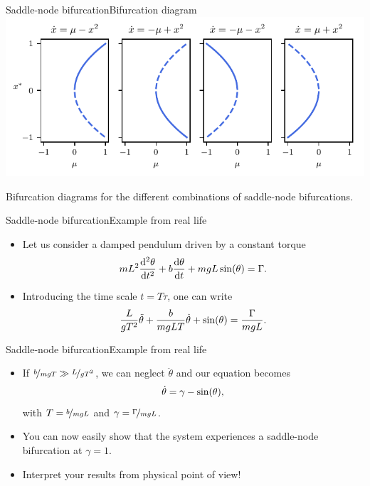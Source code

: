 \documentclass[usenames,dvipsnames,svgnames,10pt,aspectratio=169]{beamer}
\begin{document}
\begin{frame}[t, c]{Saddle-node bifurcation}{Bifurcation diagram}
	\centering
	\includegraphics[width=.75\textwidth]{saddle_node_bifurcation_diagrams}

	Bifurcation diagrams for the different combinations of saddle-node bifurcations.
	\vspace{1cm}
\end{frame}

\begin{frame}[t, c]{Saddle-node bifurcation}{Example from real life}
	\begin{itemize}
		\item Let us consider a damped pendulum driven by a constant torque
		\begin{equation}
			m L^2 \displaystyle \frac{\mathrm{d}^2 \theta}{\mathrm{d}t^2} + b \frac{\mathrm{d} \theta}{\mathrm{d}t} + mgL \sin (\theta) = \Gamma.
			\notag
		\end{equation}

		\bigskip

		\item Introducing the time scale $t = T \tau$, one can write
		\begin{equation}
			\displaystyle \frac{L}{gT^2} \ddot{\theta} + \frac{b}{mgL T} \dot{\theta} + \sin(\theta) = \frac{\Gamma}{mgL}.
			\notag
		\end{equation}
	\end{itemize}

	\vspace{1cm}
\end{frame}

\begin{frame}[t, c]{Saddle-node bifurcation}{Example from real life}
	\begin{itemize}
		\item If $\nicefrac{b}{mgT} \gg \nicefrac{L}{gT^2}$, we can neglect $\ddot{\theta}$ and our equation becomes
		\begin{equation}
			\dot{\theta} = \gamma - \sin ( \theta ),
			\notag
		\end{equation}
		with $T = \nicefrac{b}{mgL}$ and $\gamma = \nicefrac{\Gamma}{mgL}$.

		\bigskip

		\item You can now easily show that the system experiences a saddle-node bifurcation at $\gamma = 1$.

		\bigskip

		\item Interpret your results from physical point of view!
	\end{itemize}

	\vspace{1cm}
\end{frame}
\end{document}
